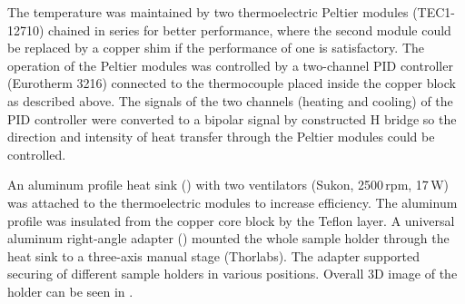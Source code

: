 \begin{figure}
	\centering
	\caption[%
		Teflon insulation of thermostated cell holder.%
	]{%
	}
	\label{\figlabel{thermostated_holder:insulation_drawing}}
\end{figure}

The temperature was maintained by two thermoelectric Peltier modules
(TEC1-12710) chained in series for better performance, where the second module
could be replaced by a copper shim if the performance of one is satisfactory.
The operation of the Peltier modules was controlled by a two-channel PID
controller (Eurotherm 3216) connected to the thermocouple placed inside the
copper block as described above.
The signals of the two channels (heating and cooling) of the PID controller
were converted to a bipolar signal by constructed H bridge so the direction
and intensity of heat transfer through the Peltier modules could be controlled.

An aluminum profile heat sink
()
with two ventilators (Sukon, 2500\,rpm, 17\,W) was attached to the
thermoelectric modules to increase efficiency.
The aluminum profile was insulated from the copper core block by the Teflon
layer.
A universal aluminum right-angle adapter
()
mounted the whole sample holder through the heat sink to a three-axis manual
stage (Thorlabs).
The adapter supported securing of different sample holders in various
positions. Overall 3D image of the holder can be seen in
.

\begin{figure}
	\centering
	\caption[%
		Teflon cover of sample cell and universal aluminum right-angle
		adapter for thermostated sample holder.%
	]{%
	}
	\label{\figlabel{thermostated_holder:stand_drawing}}
\end{figure}

\begin{figure}
	\centering
	\caption[%
		Aluminum profile heat sink for the thermostated cell holder.%
	]{%
	}
	\label{\figlabel{thermostated_holder:heat_sink_drawing}}
\end{figure}

